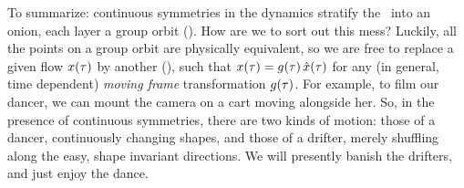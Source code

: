 \documentclass[aip,cha,reprint,
secnumarabic,
nofootinbib, tightenlines,
nobibnotes, showkeys, showpacs,
groupedaddress
]{revtex4-1}
\begin{document}
To summarize: continuous symmetries in the dynamics stratify the \statesp\
into an onion, each layer a group orbit (). How are we to sort out this mess? Luckily, all the points on a group orbit are physically equivalent, so we are
free to replace a given flow $x(\tau)$ by another \sspRed(\zeit), such that $x(\tau)=g(\tau)\,\hat{x}(\tau)$ for any (in general, time dependent) {\em moving frame} transformation $g(\tau)$. For example, to film our dancer, we can mount the camera
on a cart moving alongside her. So, in the presence of continuous symmetries,
there are two kinds of motion: those of a dancer, continuously changing
shapes, and those of a drifter, merely shuffling along the easy, shape invariant directions. We will presently banish the drifters, and just enjoy the dance.
\end{document}
